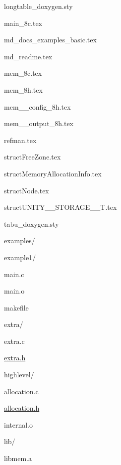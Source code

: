\begin{DoxyItemize}
\begin{DoxyItemize}
\begin{DoxyItemize}
\item longtable\+\_\+doxygen.\+sty
\item main\+\_\+8c.\+tex
\item md\+\_\+docs\+\_\+examples\+\_\+basic.\+tex
\item md\+\_\+readme.\+tex
\item mem\+\_\+8c.\+tex
\item mem\+\_\+8h.\+tex
\item mem\+\_\+\+\_\+config\+\_\+8h.\+tex
\item mem\+\_\+\+\_\+output\+\_\+8h.\+tex
\item refman.\+tex
\item struct\+Free\+Zone.\+tex
\item struct\+Memory\+Allocation\+Info.\+tex
\item struct\+Node.\+tex
\item struct\+UNITY\+\_\+\+\_\+\+STORAGE\+\_\+\+\_\+\+T.\+tex
\item tabu\+\_\+doxygen.\+sty
\end{DoxyItemize}
\end{DoxyItemize}
\item examples/
\begin{DoxyItemize}
\item example1/
\begin{DoxyItemize}
\item main.\+c
\item main.\+o
\item makefile
\end{DoxyItemize}
\end{DoxyItemize}
\item extra/
\begin{DoxyItemize}
\item extra.\+c
\item \mbox{\hyperlink{extra_8h_source}{extra.\+h}}
\end{DoxyItemize}
\item highlevel/
\begin{DoxyItemize}
\item allocation.\+c
\item \mbox{\hyperlink{allocation_8h_source}{allocation.\+h}}
\end{DoxyItemize}
\item internal.\+o
\item lib/
\begin{DoxyItemize}
\item libmem.\+a
\end{DoxyItemize}

\end{DoxyItemize}
